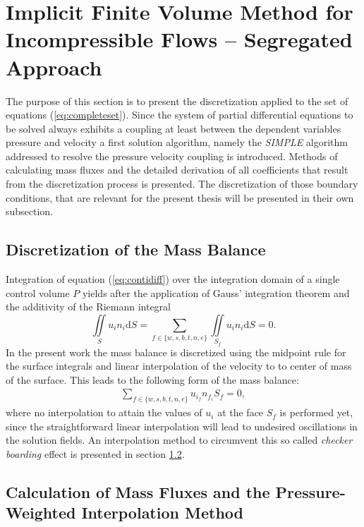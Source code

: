 \section{Implicit Finite Volume Method for Incompressible Flows -- Segregated Approach}

  The purpose of this section is to present the discretization applied to the set of equations (\ref{eq:completeset}). Since the system of partial differential equations to be solved always exhibits a coupling at least between the dependent variables pressure and velocity a first solution algorithm, namely the \emph{SIMPLE} algorithm addressed to resolve the pressure velocity coupling is introduced. Methods of calculating mass fluxes and the detailed derivation of all coefficients that result from the discretization process is presented. The discretization of those boundary conditions, that are relevant for the present thesis will be presented in their own subsection.

\subsection{Discretization of the Mass Balance}
Integration of equation (\ref{eq:contidiff}) over the integration domain of a single control volume \(P\) yields after the application of Gauss' integration theorem and the additivity of the Riemann integral
\begin{displaymath}
\iint\limits_S u_i n_i \mathrm{d}S = \sum_{f \in \{w,s,b,t,n,e\}} \iint\limits_{S_f} u_i n_{i} \mathrm{d}S = 0.
\end{displaymath}
In the present work the mass balance is discretized using the midpoint rule for the surface integrals and linear interpolation of the velocity to to center of mass of the surface. This leads to the following form of the mass balance:
\begin{align*}
\sum_{f \in \{w,s,b,t,n,e\}} u_{i_f} n_{f_i} S_f = 0,
\end{align*}
where no interpolation to attain the values of \(u_i\) at the face \(S_f\) is performed yet, since the straightforward linear interpolation will lead to undesired oscillations in the solution fields. An interpolation method to circumvent this so called \emph{checker boarding} effect is presented in section \ref{sec:massflux}.

  \subsection{Calculation of Mass Fluxes and the Pressure-Weighted Interpolation Method}
  \label{sec:massflux}


